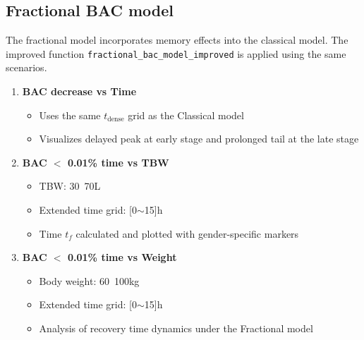 \documentclass[11pt]{article}
\begin{document}
\subsection{Fractional BAC model}\label{fractional_bac}
The fractional model incorporates memory effects into the classical model. The improved function \texttt{fractional\_bac\_model\_improved} is applied using the same scenarios.
\begin{enumerate}
  \item \textbf{BAC decrease vs Time}\
    \begin{itemize}
      \item Uses the same $t_{\mathrm{dense}}$ grid as the Classical model
      \item Visualizes delayed peak at early stage and prolonged tail at the late stage
    \end{itemize}

  \item \textbf{BAC $<$ 0.01\% time vs TBW}\
    \begin{itemize}
      \item TBW: 30~70L
      \item Extended time grid: [0$\sim$15]h
      \item Time $t_f$ calculated and plotted with gender-specific markers
    \end{itemize}

  \item \textbf{BAC $<$ 0.01\% time vs Weight}\
    \begin{itemize}
      \item Body weight: 60~100kg
      \item  Extended time grid: [0$\sim$15]h
      \item Analysis of recovery time dynamics under the Fractional model
    \end{itemize}
\end{enumerate}
\end{document}
